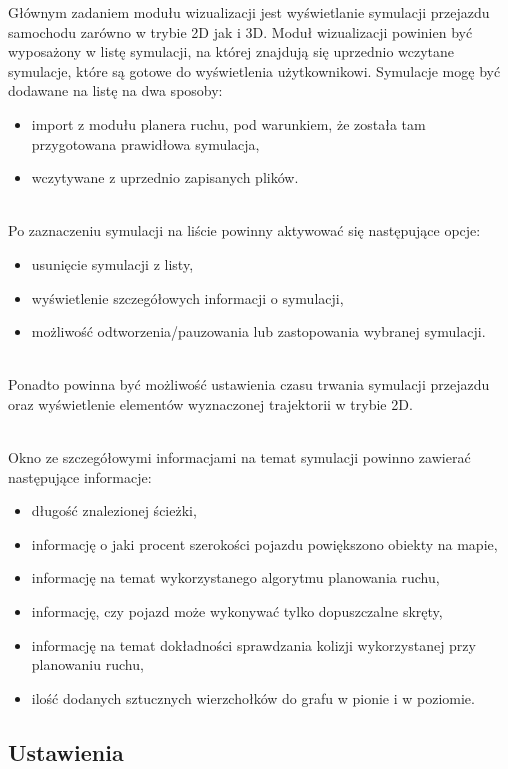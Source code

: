 \documentclass[a4paper,11pt,twoside]{report}
\theoremstyle{definition}
\begin{document}
Głównym zadaniem modułu wizualizacji jest wyświetlanie symulacji przejazdu samochodu zarówno w trybie 2D jak i 3D. Moduł wizualizacji powinien być wyposażony w listę symulacji, na której znajdują się uprzednio wczytane symulacje, które są gotowe do wyświetlenia użytkownikowi. Symulacje mogę być dodawane na listę na dwa sposoby:
\begin{itemize}
	\item import z modułu planera ruchu, pod warunkiem, że została tam przygotowana prawidłowa symulacja,
	\item wczytywane z uprzednio zapisanych plików. 
\end{itemize}

~\\Po zaznaczeniu symulacji na liście powinny aktywować się następujące opcje:
\begin{itemize}
	\item usunięcie symulacji z listy,
	\item wyświetlenie szczegółowych informacji o symulacji,
	\item możliwość odtworzenia/pauzowania lub zastopowania wybranej symulacji.
\end{itemize}

~\\Ponadto powinna być możliwość ustawienia czasu trwania symulacji przejazdu oraz wyświetlenie elementów wyznaczonej trajektorii w trybie 2D.

~\\Okno ze szczegółowymi informacjami na temat symulacji powinno zawierać następujące informacje:
\begin{itemize}
	\item długość znalezionej ścieżki,
	\item informację o jaki procent szerokości pojazdu powiększono obiekty na mapie,
	\item informację na temat wykorzystanego algorytmu planowania ruchu,
	\item informację, czy pojazd może wykonywać tylko dopuszczalne skręty,
	\item informację na temat dokładności sprawdzania kolizji wykorzystanej przy planowaniu ruchu,
	\item ilość dodanych sztucznych wierzchołków do grafu w pionie i w poziomie.
\end{itemize}

\newpage

\subsection{Ustawienia}
\end{document}
